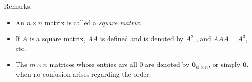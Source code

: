\documentclass[10pt,]{book}
\theoremstyle{plain}
\theoremstyle{definition}
\theoremstyle{definition}
\theoremstyle{definition}
\theoremstyle{definition}
\begin{document}
\par
Remarks:%
\par
\leavevmode%
\begin{itemize}[label=\textbullet]
\item{} An \(n\times n\) matrix is called a \emph{square matrix}.%
\item{} If \(A\) is a square matrix, \(A A\) is defined and is denoted by \(A^2\) , and \(A A A = A^3\), etc. %
\item{} The \(m\times n\) matrices whose entries are all 0 are denoted by \(\pmb{0}_{m\times n}\), or simply \(\pmb{ 0}\), when no confusion arises regarding the order.\label{notation-1}
%
\end{itemize}
%
\typeout{************************************************}
\typeout{************************************************}
\end{document}
